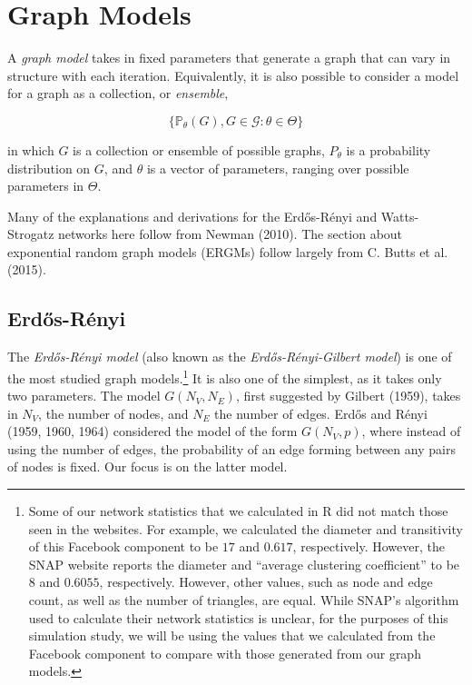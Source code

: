 \documentclass[12pt,twoside]{amherstthesis}
\begin{document}
  \chapter{Graph Models}\label{graph-models}
  
  A \emph{graph model} takes in fixed parameters that generate a graph
  that can vary in structure with each iteration. Equivalently, it is also
  possible to consider a model for a graph as a collection, or
  \emph{ensemble},
  
  \[\{\mathbb{P}_{\theta}(G), G \in \mathcal{G}: \theta \in \Theta\}\]
  
  in which \(G\) is a collection or ensemble of possible graphs,
  \(P_\theta\) is a probability distribution on \(G\), and \(\theta\) is a
  vector of parameters, ranging over possible parameters in \(\Theta\).
  
  Many of the explanations and derivations for the Erdős-Rényi and
  Watts-Strogatz networks here follow from Newman (2010). The section
  about exponential random graph models (ERGMs) follow largely from C.
  Butts et al. (2015).
  
  \section{Erdős-Rényi}\label{erdos-renyi}
  
  The \emph{Erdős-Rényi model} (also known as the
  \emph{Erdős-Rényi-Gilbert model}) is one of the most studied graph
  models.\footnote{Some of our network statistics that we calculated in R
    did not match those seen in the websites. For example, we calculated
    the diameter and transitivity of this Facebook component to be \(17\)
    and \(0.617\), respectively. However, the SNAP website reports the
    diameter and ``average clustering coefficient'' to be \(8\) and
    \(0.6055\), respectively. However, other values, such as node and edge
    count, as well as the number of triangles, are equal. While SNAP's
    algorithm used to calculate their network statistics is unclear, for
    the purposes of this simulation study, we will be using the values
    that we calculated from the Facebook component to compare with those
    generated from our graph models.} It is also one of the simplest, as
  it takes only two parameters. The model \(G(N_V, N_E)\), first suggested
  by Gilbert (1959), takes in \(N_V\), the number of nodes, and \(N_E\)
  the number of edges. Erdős and Rényi (1959, 1960, 1964) considered the
  model of the form \(G(N_{V}, p)\), where instead of using the number of
  edges, the probability of an edge forming between any pairs of nodes is
  fixed. Our focus is on the latter model.
  
\end{document}
